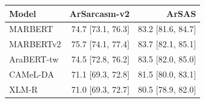 \begin{tabular}{lrr}
\toprule
Model & ArSarcasm-v2 & ArSAS \\
\midrule
MARBERT & 74.7 {\scriptsize[73.1, 76.3]} & 83.2 {\scriptsize[81.6, 84.7]} \\
MARBERTv2 & 75.7 {\scriptsize[74.1, 77.4]} & 83.7 {\scriptsize[82.1, 85.1]} \\
AraBERT-tw & 74.5 {\scriptsize[72.8, 76.2]} & 83.5 {\scriptsize[82.0, 85.0]} \\
CAMeL-DA & 71.1 {\scriptsize[69.3, 72.8]} & 81.5 {\scriptsize[80.0, 83.1]} \\
XLM-R & 71.0 {\scriptsize[69.3, 72.7]} & 80.5 {\scriptsize[78.9, 82.0]} \\
\bottomrule
\end{tabular}
